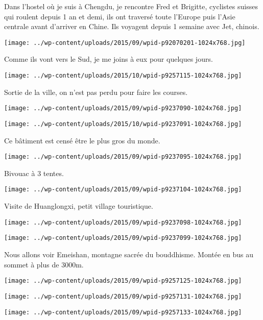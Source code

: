 \pagebreak
 Dans l'hostel où je suis à Chengdu, je rencontre Fred et Brigitte, cyclistes suisses qui roulent depuis 1 an et demi, ils ont traversé toute l'Europe puis l'Asie centrale avant d'arriver en Chine. Ils voyagent depuis 1 semaine avec Jet, chinois. 
\begin{center} \texttt{[image: ../wp-content/uploads/2015/09/wpid-p92070201-1024x768.jpg]} \end{center}

 Comme ils vont vers le Sud, je me joins à eux pour quelques jours. 
\begin{center} \texttt{[image: ../wp-content/uploads/2015/10/wpid-p9257115-1024x768.jpg]} \end{center}

\pagebreak
 Sortie de la ville, on n'est pas perdu pour faire les courses. 
\begin{center} \texttt{[image: ../wp-content/uploads/2015/09/wpid-p9237090-1024x768.jpg]} \end{center}
\begin{center} \texttt{[image: ../wp-content/uploads/2015/10/wpid-p9237091-1024x768.jpg]} \end{center}

\pagebreak
 Ce bâtiment est censé être le plus gros du monde. 
\begin{center} \texttt{[image: ../wp-content/uploads/2015/09/wpid-p9237095-1024x768.jpg]} \end{center}

 Bivouac à 3 tentes. 
\begin{center} \texttt{[image: ../wp-content/uploads/2015/09/wpid-p9237104-1024x768.jpg]} \end{center}

\pagebreak
 Visite de Huanglongxi, petit village touristique. 
\begin{center} \texttt{[image: ../wp-content/uploads/2015/09/wpid-p9237098-1024x768.jpg]} \end{center}
\begin{center} \texttt{[image: ../wp-content/uploads/2015/09/wpid-p9237099-1024x768.jpg]} \end{center}

\pagebreak
 Nous allons voir Emeishan, montagne sacrée du bouddhisme. Montée en bus au sommet à plus de 3000m. 
\begin{center} \texttt{[image: ../wp-content/uploads/2015/09/wpid-p9257125-1024x768.jpg]} \end{center}
\begin{center} \texttt{[image: ../wp-content/uploads/2015/09/wpid-p9257131-1024x768.jpg]} \end{center}
\begin{center} \texttt{[image: ../wp-content/uploads/2015/09/wpid-p9257133-1024x768.jpg]} \end{center}

